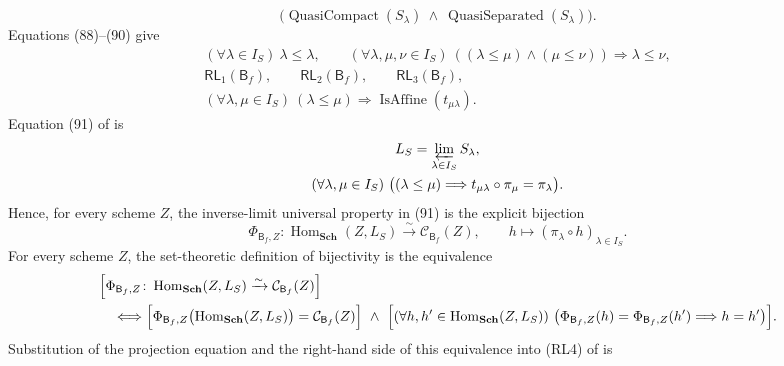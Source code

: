 \begin{definition}
\[      \bigl(
        \operatorname{QuasiCompact}(S_\lambda)
        \ \wedge\
        \operatorname{QuasiSeparated}(S_\lambda)
      \bigr).                                                       \tag{F0c}
  \]
  Equations (88)--(90) give
  \[
  \begin{gathered}
    (\forall\lambda\in I_S)\ \lambda\leq\lambda,\qquad
    (\forall\lambda,\mu,\nu\in I_S)\
      ((\lambda\leq\mu)\wedge(\mu\leq\nu))
        \Longrightarrow\lambda\leq\nu,\\
    \mathsf{RL}_1(\mathsf B_f),\qquad
    \mathsf{RL}_2(\mathsf B_f),\qquad
    \mathsf{RL}_3(\mathsf B_f),\\
    (\forall\lambda,\mu\in I_S)\
      (\lambda\leq\mu)\Longrightarrow
      \operatorname{IsAffine}(t_{\mu\lambda}).
  \end{gathered}                                                    \tag{F0d}
  \]
  Equation (91) of  is
  \[
  \begin{gathered}
    L_S=\varprojlim_{\lambda\in I_S}S_\lambda,\\
    (\forall\lambda,\mu\in I_S)\
      \bigl((\lambda\leq\mu)\Longrightarrow
        t_{\mu\lambda}\circ\pi_\mu=\pi_\lambda\bigr).
  \end{gathered}
  \]
  Hence, for every scheme $Z$, the inverse-limit universal property in (91)
  is the explicit bijection
  \[
    \Phi_{\mathsf B_f,Z}\colon
      \operatorname{Hom}_{\mathbf{Sch}}(Z,L_S)
        \xrightarrow{\sim}\mathcal C_{\mathsf B_f}(Z),
    \qquad
    h\longmapsto(\pi_\lambda\circ h)_{\lambda\in I_S}.
  \]
  For every scheme $Z$, the set-theoretic definition of bijectivity is the
  equivalence
  \[
  \begin{aligned}
    &\Bigl[
      \Phi_{\mathsf B_f,Z}\colon
        \operatorname{Hom}_{\mathbf{Sch}}(Z,L_S)
          \xrightarrow{\sim}\mathcal C_{\mathsf B_f}(Z)
    \Bigr]\\
    &\quad\Longleftrightarrow
    \Bigl[
      \Phi_{\mathsf B_f,Z}
        \bigl(\operatorname{Hom}_{\mathbf{Sch}}(Z,L_S)\bigr)
        =\mathcal C_{\mathsf B_f}(Z)
    \Bigr]
    \ \wedge\
    \Bigl[
      (\forall h,h'\in\operatorname{Hom}_{\mathbf{Sch}}(Z,L_S))\
      \bigl(
        \Phi_{\mathsf B_f,Z}(h)=\Phi_{\mathsf B_f,Z}(h')
        \Longrightarrow h=h'
      \bigr)
    \Bigr].
  \end{aligned}
  \]
  Substitution of the projection equation and the right-hand side of this
  equivalence into (RL4) of
   is
  \[
  \begin{aligned}

\end{aligned}\]
\end{definition}

